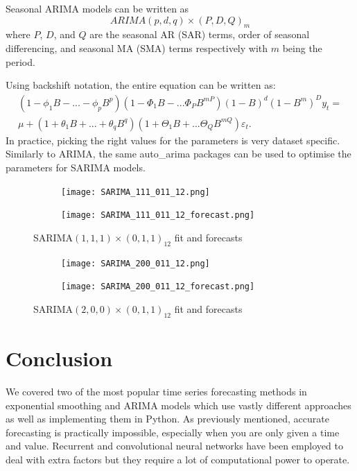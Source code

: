 \documentclass{article}
\begin{document}
  Seasonal ARIMA models can be written as 
  \begin{equation*}
    ARIMA(p,d,q)\times(P,D,Q)_m
  \end{equation*}
  where $P$, $D$, and $Q$ are the seasonal AR (SAR) terms, order of seasonal differencing, and seasonal MA (SMA) terms respectively with $m$ being the period.

  Using backshift notation, the entire equation can be written as:
  \begin{equation*}
    \begin{split}
      (1 - \phi_1B - ... - \phi_pB^p)(1 - \Phi_1B - ... \Phi_PB^{mP})(1 - B)^d(1 - B^m)^D y_t = \\
      \mu + (1 + \theta_1B + ... +\theta_qB^q)(1 + \Theta_1B + ... \Theta_QB^{mQ})\varepsilon_t.
    \end{split}
  \end{equation*}
  In practice, picking the right values for the parameters is very dataset specific. Similarly to ARIMA, the same auto\_arima packages can be used to optimise the parameters for SARIMA models.

  \begin{figure}[H]
    \centering
    \captionsetup{justification=centering}
    \begin{subfigure}[b]{0.49\linewidth}
      \texttt{[image: SARIMA\_111\_011\_12.png]}
    \end{subfigure}
    \begin{subfigure}[b]{0.49\linewidth}
      \texttt{[image: SARIMA\_111\_011\_12\_forecast.png]}
    \end{subfigure}
    \caption{SARIMA$(1,1,1)\times(0,1,1)_{12}$ fit and forecasts}
    \begin{subfigure}[b]{0.49\linewidth}
      \texttt{[image: SARIMA\_200\_011\_12.png]}
    \end{subfigure}
    \begin{subfigure}[b]{0.49\linewidth}
      \texttt{[image: SARIMA\_200\_011\_12\_forecast.png]}
    \end{subfigure}
    \caption{SARIMA$(2,0,0)\times(0,1,1)_{12}$ fit and forecasts}
  \end{figure}

  \section{Conclusion}
  We covered two of the most popular time series forecasting methods in exponential smoothing and ARIMA models which use vastly different approaches as well as implementing them in Python. As previously mentioned, accurate forecasting is practically impossible, especially when you are only given a time and value. Recurrent and convolutional neural networks have been employed to deal with extra factors but they require a lot of computational power to operate.
\end{document}
